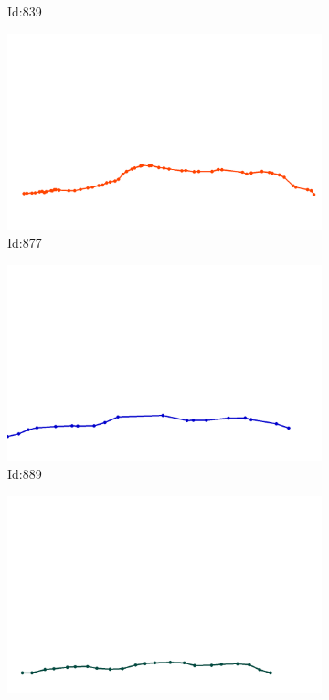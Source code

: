 \documentclass[12pt,twoside]{report}
\begin{document}
\begin{figure}
\begin{subfigure}[b]{0.20\textwidth}
\caption{Id:839}
\end{subfigure}
\begin{subfigure}[b]{0.20\textwidth}
\centering
\includegraphics[width=\textwidth]{../trajectories/877.png}
\caption{Id:877}
\end{subfigure}
\begin{subfigure}[b]{0.20\textwidth}
\centering
\includegraphics[width=\textwidth]{../trajectories/889.png}
\caption{Id:889}
\end{subfigure}
\begin{subfigure}[b]{0.20\textwidth}
\centering
\includegraphics[width=\textwidth]{../trajectories/916.png}

\end{subfigure}
\end{figure}
\end{document}
